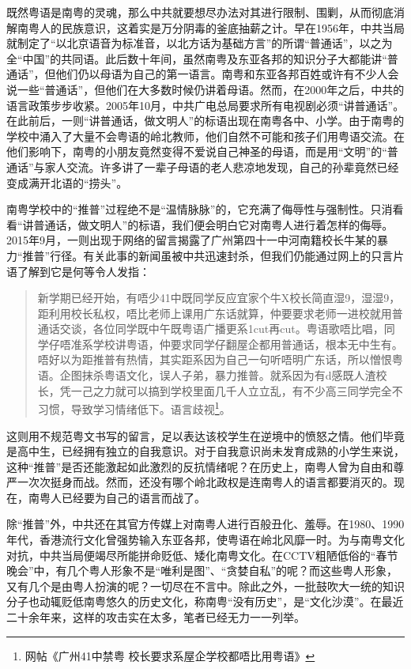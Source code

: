 既然粤语是南粤的灵魂，那么中共就要想尽办法对其进行限制、围剿，从而彻底消解南粤人的民族意识，这着实是万分阴毒的釜底抽薪之计。早在1956年，中共当局就制定了“以北京语音为标准音，以北方话为基础方言”的所谓“普通话”，以之为全“中国”的共同语。此后数十年间，虽然南粤及东亚各邦的知识分子大都能讲“普通话”，但他们仍以母语为自己的第一语言。南粤和东亚各邦百姓或许有不少人会说一些“普通话”，但他们在大多数时候仍讲着母语。然而，在2000年之后，中共的语言政策步步收紧。2005年10月，中共广电总局要求所有电视剧必须“讲普通话”。在此前后，一则“讲普通话，做文明人”的标语出现在南粤各中、小学。由于南粤的学校中涌入了大量不会粤语的岭北教师，他们自然不可能和孩子们用粤语交流。在他们影响下，南粤的小朋友竟然变得不爱说自己神圣的母语，而是用“文明”的“普通话”与家人交流。许多讲了一辈子母语的老人悲凉地发现，自己的孙辈竟然已经变成满开北语的“捞头”。

南粤学校中的“推普”过程绝不是“温情脉脉”的，它充满了侮辱性与强制性。只消看看“讲普通话，做文明人”的标语，我们便会明白它对南粤人进行着怎样的侮辱。2015年9月，一则出现于网络的留言揭露了广州第四十一中河南籍校长牛某的暴力“推普”行径。有关此事的新闻虽被中共迅速封杀，但我们仍能通过网上的只言片语了解到它是何等令人发指：

\begin{quote}

新学期已经开始，有唔少41中既同学反应宜家个牛X校长简直湿9，湿湿9，距利用校长私权，唔比老师上课用广东话就算，仲要要求老师一进校就用普通话交谈，各位同学既中午既粤语广播更系1cut再cut。粤语歌唔比唱，同学仔唔准系学校讲粤语，仲要求同学仔翻屋企都用普通话，根本无中生有。唔好以为距推普有热情，其实距系因为自己一句听唔明广东话，所以憎恨粤语。企图抹杀粤语文化，误人子弟，暴力推普。就系因为有d感既人渣校长，凭一己之力就可以搞到学校里面几千人立立乱，有不少高三同学完全不习惯，导致学习情绪低下。语言歧视\footnote{网帖《广州41中禁粤 校长要求系屋企学校都唔比用粤语》}。

\end{quote}

这则用不规范粤文书写的留言，足以表达该校学生在逆境中的愤怒之情。他们毕竟是高中生，已经拥有独立的自我意识。对于自我意识尚未发育成熟的小学生来说，这种“推普”是否还能激起如此激烈的反抗情绪呢？在历史上，南粤人曾为自由和尊严一次次挺身而战。然而，还没有哪个岭北政权是连南粤人的语言都要消灭的。现在，南粤人已经要为自己的语言而战了。

除“推普”外，中共还在其官方传媒上对南粤人进行百般丑化、羞辱。在1980、1990年代，香港流行文化曾强势输入东亚各邦，使粤语在岭北风靡一时。为与南粤文化对抗，中共当局便竭尽所能拼命贬低、矮化南粤文化。在CCTV粗陋低俗的“春节晚会”中，有几个粤人形象不是“唯利是图”、“贪婪自私”的呢？而这些粤人形象，又有几个是由粤人扮演的呢？一切尽在不言中。除此之外，一批鼓吹大一统的知识分子也动辄贬低南粤悠久的历史文化，称南粤“没有历史”，是“文化沙漠”。在最近二十余年来，这样的攻击实在太多，笔者已经无力一一列举。


